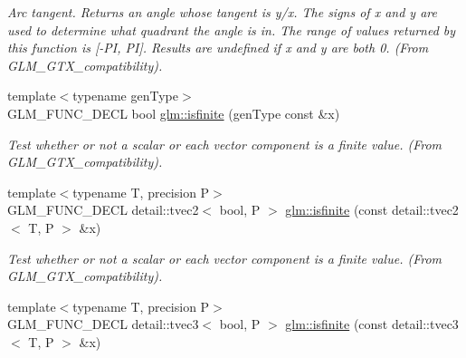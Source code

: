 \begin{CompactItemize}
\begin{CompactList}\small\item\em Arc tangent. Returns an angle whose tangent is y/x. The signs of x and y are used to determine what quadrant the angle is in. The range of values returned by this function is \mbox{[}-PI, PI\mbox{]}. Results are undefined if x and y are both 0. (From GLM\_\-GTX\_\-compatibility). \item\end{CompactList}\item 
\hypertarget{group__gtx__compatibility_g0f43f5c5f8a44847a752d956124b16c6}{
{\footnotesize template$<$typename genType$>$ }\\GLM\_\-FUNC\_\-DECL bool \hyperlink{group__gtx__compatibility_g0f43f5c5f8a44847a752d956124b16c6}{glm::isfinite} (genType const \&x)}
\label{group__gtx__compatibility_g0f43f5c5f8a44847a752d956124b16c6}

\begin{CompactList}\small\item\em Test whether or not a scalar or each vector component is a finite value. (From GLM\_\-GTX\_\-compatibility). \item\end{CompactList}\item 
\hypertarget{group__gtx__compatibility_ga839174ff8da8801658c229b845445e7}{
{\footnotesize template$<$typename T, precision P$>$ }\\GLM\_\-FUNC\_\-DECL detail::tvec2$<$ bool, P $>$ \hyperlink{group__gtx__compatibility_ga839174ff8da8801658c229b845445e7}{glm::isfinite} (const detail::tvec2$<$ T, P $>$ \&x)}
\label{group__gtx__compatibility_ga839174ff8da8801658c229b845445e7}

\begin{CompactList}\small\item\em Test whether or not a scalar or each vector component is a finite value. (From GLM\_\-GTX\_\-compatibility). \item\end{CompactList}\item 
\hypertarget{group__gtx__compatibility_gf5f4c2e344d29a7d71f6894384a702e7}{
{\footnotesize template$<$typename T, precision P$>$ }\\GLM\_\-FUNC\_\-DECL detail::tvec3$<$ bool, P $>$ \hyperlink{group__gtx__compatibility_gf5f4c2e344d29a7d71f6894384a702e7}{glm::isfinite} (const detail::tvec3$<$ T, P $>$ \&x)}
\label{group__gtx__compatibility_gf5f4c2e344d29a7d71f6894384a702e7}


\end{CompactItemize}

